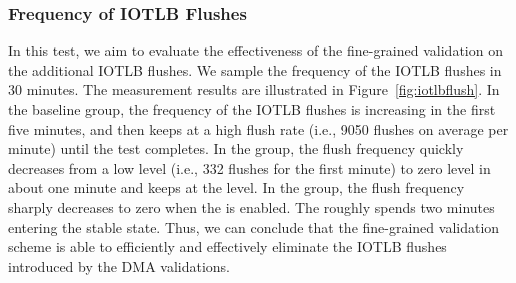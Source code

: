 \subsubsection{Frequency of IOTLB Flushes}
In this test, we aim to evaluate the effectiveness of the fine-grained validation on the additional IOTLB flushes.
We sample the frequency of the IOTLB flushes in 30 minutes.
The measurement results are illustrated in Figure~\ref{fig:iotlbflush}.
In the baseline group, the frequency of the IOTLB flushes is increasing in the first five minutes, and then keeps at a high flush rate (i.e., 9050 flushes on average per minute) until the test completes.
In the \prename group, the flush frequency quickly decreases from a low level (i.e., 332 flushes for the first minute) to zero level in about one minute and keeps at the level.
In the \dynname group, the flush frequency sharply decreases to zero when the \name is enabled. The \name roughly spends two minutes entering the stable state.
Thus, we can conclude that the fine-grained validation scheme is able to efficiently and effectively eliminate the IOTLB flushes introduced by the DMA validations.


